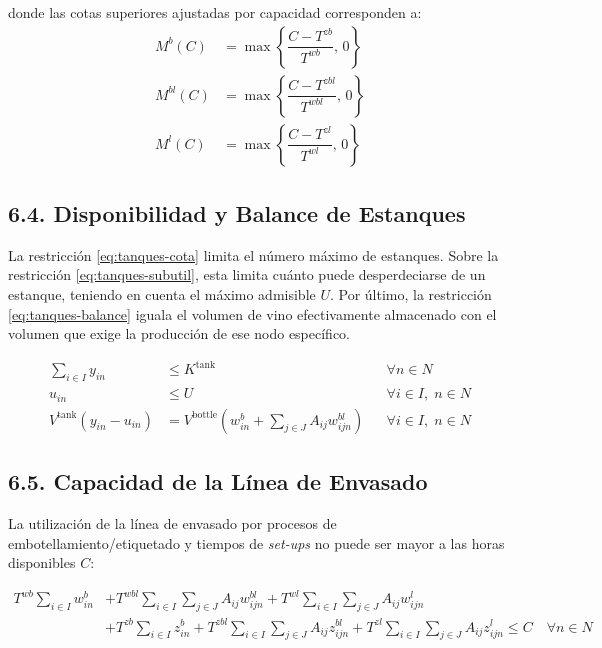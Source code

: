 \documentclass[11pt, letterpaper]{article}
\begin{document}
\noindent donde las cotas superiores ajustadas por capacidad corresponden a:
\begin{align}
    M^b(C) &= \max \left\{ \dfrac{C - T^{zb}}{T^{wb}},\, 0 \right\} \label{eq:mb} \\
    M^{bl}(C) &= \max \left\{ \dfrac{C - T^{zbl}}{T^{wbl}},\, 0 \right\} \label{eq:mbl} \\
    M^l(C) &= \max \left\{ \dfrac{C - T^{zl}}{T^{wl}},\, 0 \right\} \label{eq:ml}
\end{align}

\newpage

\subsection*{6.4. Disponibilidad y Balance de Estanques}

La restricción \eqref{eq:tanques-cota} limita el número máximo de estanques. Sobre la restricción \eqref{eq:tanques-subutil}, esta limita cuánto puede desperdeciarse de un estanque, teniendo en cuenta el máximo admisible $U$. Por último, la restricción \eqref{eq:tanques-balance} iguala el volumen de vino efectivamente almacenado con el volumen que exige la producción de ese nodo específico.

\begin{align}
    \sum_{i \in I} y_{in} &\leq K^{\mathrm{tank}} && \forall n \in N \label{eq:tanques-cota} \\
    u_{in} &\leq U && \forall i \in I,\; n \in N \label{eq:tanques-subutil} \\
    V^{\mathrm{tank}} (y_{in} - u_{in}) &= V^{\mathrm{bottle}} \left( w^b_{in} + \sum_{j \in J} A_{ij} w^{bl}_{ijn} \right) && \forall i \in I,\; n \in N \label{eq:tanques-balance}
\end{align}

\subsection*{6.5. Capacidad de la Línea de Envasado}

La utilización de la línea de envasado por procesos de embotellamiento/etiquetado y tiempos de \textit{set-ups} no puede ser mayor a las horas disponibles $C$:

\begin{equation}
\begin{aligned}
    T^{wb}\sum_{i \in I} w^b_{in} 
    &+ T^{wbl}\sum_{i \in I} \sum_{j \in J} A_{ij} w^{bl}_{ijn} 
    + T^{wl}\sum_{i \in I} \sum_{j \in J} A_{ij} w^l_{ijn} \\
    &+ T^{zb}\sum_{i \in I} z^b_{in} 
    + T^{zbl}\sum_{i \in I} \sum_{j \in J} A_{ij} z^{bl}_{ijn} 
    + T^{zl}\sum_{i \in I} \sum_{j \in J} A_{ij} z^l_{ijn} 
    \le C \quad \forall n \in N
\end{aligned}
\label{eq:capacidad-linea}
\end{equation}
\end{document}
